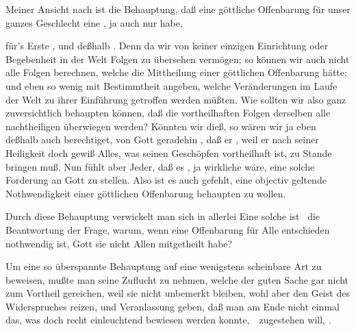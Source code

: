 \begin{center}\end{center}

\begin{aufza}
\item Meiner Ansicht nach ist die Behauptung, daß eine göttliche Offenbarung für unser ganzes Geschlecht eine , ja auch nur  habe,
\begin{aufzb}
\item für's Erste , und deßhalb . Denn da wir von keiner einzigen Einrichtung oder Begebenheit in der Welt  Folgen zu übersehen vermögen; so können wir auch nicht alle Folgen berechnen, welche die Mittheilung einer göttlichen Offenbarung hätte; und eben so wenig mit Bestimmtheit angeben, welche Veränderungen im Laufe der Welt zu ihrer Einführung getroffen werden müßten. Wie sollten wir also ganz zuversichtlich behaupten können, daß die vortheilhaften Folgen derselben alle nachtheiligen überwiegen werden? Könnten wir dieß, so wären wir ja eben deßhalb auch berechtiget, von Gott geradehin , daß er , weil er nach seiner Heiligkeit doch gewiß Alles, was seinen Geschöpfen  vortheilhaft ist, zu Stande bringen muß. Nun fühlt aber Jeder, daß es , ja wirkliche 
wäre, eine solche Forderung an Gott zu stellen. Also ist es auch gefehlt, eine objectiv geltende Nothwendigkeit einer göttlichen Offenbarung behaupten zu wollen.
\item Durch diese Behauptung verwickelt man sich in allerlei  Eine solche ist \zB\ die Beantwortung der Frage, warum, wenn eine Offenbarung für Alle entschieden nothwendig ist, Gott sie nicht Allen mitgetheilt habe?
\item Um eine so überspannte Behauptung auf eine wenigstens scheinbare Art zu beweisen, mußte man seine Zuflucht zu  nehmen, welche der guten Sache gar nicht zum Vortheil gereichen, weil sie nicht unbemerkt bleiben, wohl aber den Geist des Widerspruches reizen, und Veranlassung geben, daß man am Ende nicht einmal das, was doch recht einleuchtend bewiesen werden konnte,~\ zugestehen will, .

\end{aufzb}
\end{aufza}
